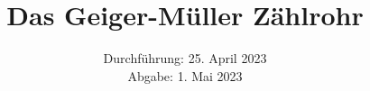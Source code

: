 

\subject{\texorpdfstring{\vspace{2ex}}{}V703\texorpdfstring{\vspace{-2ex}}{}} %
\title{Das Geiger-Müller Zählrohr} %
\date{
	Durchführung: 25. April 2023 %
	\\ Abgabe: 1. Mai 2023 %
}




\maketitle
\thispagestyle{empty}


\tableofcontents
\newpage







\printbibliography{}

\newpage



